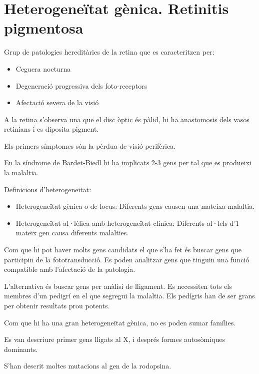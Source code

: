 \section{Heterogeneïtat gènica. Retinitis pigmentosa}
\label{sec:heter-genic-reti}

Grup de patologies hereditàries de la retina que es caracteritzen per:
\begin{itemize}
\item Ceguera nocturna
\item Degeneració progressiva dels foto-receptors
\item Afectació severa de la visió
\end{itemize}

A la retina s'observa una que el disc òptic és pàlid, hi ha
anastomosis dels vasos retinians i es diposita pigment.

Els primers símptomes són la pèrdua de visió perifèrica.

En la síndrome de Bardet-Biedl hi ha implicats 2-3 gens per tal que es
produeixi la malaltia.

Definicions d'heterogeneïtat:
\begin{itemize}
\item Heterogeneïtat gènica o de locus: Diferents gens causen una
  mateixa malaltia.
\item Heterogeneïtat al·lèlica amb heterogeneïtat clínica: Diferents
  al·lels d'1 mateix gen causa diferents malalties.
\end{itemize}


Com que hi pot haver molts gens candidats el que s'ha fet és buscar
gens que participin de la fototransducció. Es poden analitzar gens que
tinguin una funció compatible amb l'afectació de la patologia.

L'alternativa és buscar gens per anàlisi de lligament. Es necessiten
tots els membres d'un pedigrí en el que segregui la malaltia. Els
pedígris han de ser grans per obtenir resultats prou potents.

Com que hi ha una gran heterogeneïtat gènica, no es poden sumar
famílies.

Es van descriure primer gens lligats al X, i després formes
autosòmiques dominants.

S'han descrit moltes mutacions al gen de la rodopsina.

